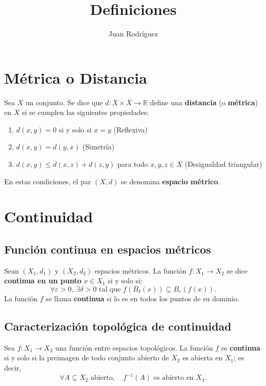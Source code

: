 \documentclass[12pt]{article}
\title{Definiciones}
\author{Juan Rodríguez}
\date{}
\begin{document}
\maketitle
\tableofcontents
\newpage
{}
\section*{Métrica o Distancia}
\begin{tcolorbox}[definitionstyle]
Sea \( X \) un conjunto.  
Se dice que \( d : X \times X \to \mathbb{R} \) define una \textbf{distancia} (o \textbf{métrica}) en \( X \) si se cumplen las siguientes propiedades:

\begin{enumerate}
    \item \( d(x,y) = 0 \) si y solo si \( x = y \) \quad (Reflexiva)
    \item \( d(x,y) = d(y,x) \) \quad (Simetría)
    \item \( d(x,y) \leq d(x,z) + d(z,y) \) para todo \( x,y,z \in X \) \quad (Desigualdad triangular)
\end{enumerate}

En estas condiciones, el par \( (X,d) \) se denomina \textbf{espacio métrico}.
\end{tcolorbox}

\section*{Continuidad}
\subsection*{Función continua en espacios métricos}
\begin{tcolorbox}[definitionstyle]
Sean \((X_1, d_1)\) y \((X_2, d_2)\) espacios métricos.  
La función \(f : X_1 \to X_2\) se dice \textbf{continua en un punto} \(x \in X_1\) si y solo si:
\[
\forall \varepsilon > 0, \ \exists \delta > 0 \text{ tal que } 
f(B_\delta(x)) \subseteq B_\varepsilon(f(x)).
\]
La función \(f\) se llama \textbf{continua} si lo es en todos los puntos de su dominio.
\end{tcolorbox}

\subsection*{Caracterización topológica de continuidad}
\begin{tcolorbox}[definitionstyle]
Sea \(f : X_1 \to X_2\) una función entre espacios topológicos.  
La función \(f\) es \textbf{continua} si y solo si la preimagen de todo conjunto abierto de \(X_2\) es abierta en \(X_1\); es decir,
\[
\forall A \subseteq X_2 \text{ abierto}, \quad f^{-1}(A) \text{ es abierto en } X_1.
\]
\end{tcolorbox}
\end{document}
